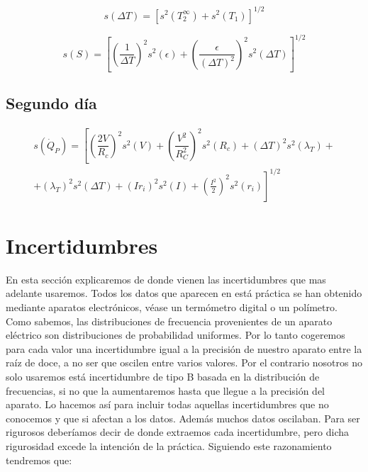 \documentclass[12pt,a4paper]{article}
\newcommand{\parentesis}[1]{\left( #1  \right)}
\newcommand{\ccorchetes}[1]{\left[ #1  \right]}
\begin{document}
\begin{equation}
s(\Delta T) = \ccorchetes{s^2(T_2^{\infty})+s^2(T_1)}^{1/2}
\end{equation}

\begin{equation}
s(S) = \ccorchetes{\parentesis{\dfrac{1}{\Delta T}}^2 s^2(\epsilon)+  \parentesis{\dfrac{\epsilon}{(\Delta T)^2}}^2 s^2(\Delta T) }^{1/2}
\end{equation}

\subsection{Segundo día}

\begin{multline}
s(\dot{Q}_P) = \left[ \parentesis{\dfrac{2V}{R_c}}^2 s^2(V)+
\parentesis{\dfrac{V^2}{R_C^2}}^2 s^2(R_c)+(\Delta T)^2 s^2(\lambda_T) +\right. \\ \left.  + (\lambda_T)^2 s^2(\Delta T)
+ \parentesis{I r_i}^2  s^2(I) + \parentesis{\frac{I^2}{2}}^2 s^2(r_i) \right]^{1/2}
\end{multline}



\newpage

\section{Incertidumbres}

En esta sección explicaremos de donde vienen las incertidumbres que mas adelante usaremos. Todos los datos que aparecen en está práctica se han obtenido mediante aparatos electrónicos, véase un termómetro digital o un polímetro. Como sabemos, las distribuciones de frecuencia provenientes de un aparato eléctrico son distribuciones de probabilidad uniformes. Por lo tanto cogeremos para cada valor una incertidumbre igual a la precisión de nuestro aparato entre la raíz de doce, a no ser que oscilen entre varios valores. Por el contrario nosotros no solo usaremos está incertidumbre de tipo B basada en la distribución de frecuencias, si no que la aumentaremos hasta que llegue a la precisión del aparato. Lo hacemos así para incluir todas aquellas incertidumbres que no conocemos y que si afectan a los datos. Además muchos datos oscilaban. Para ser rigurosos deberíamos decir de donde extraemos cada incertidumbre, pero dicha rigurosidad excede la intención de la práctica. Siguiendo este razonamiento tendremos que:
\end{document}

